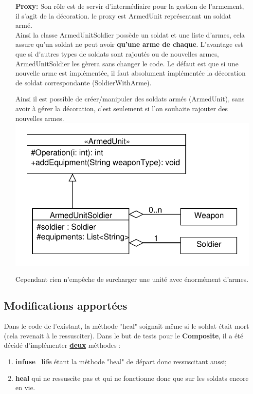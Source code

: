 ﻿\documentclass[12pt]{article}
\begin{document}
\begin{enumerate}
\item[\textbf{Proxy:}] Son rôle est de servir d'intermédiaire pour la gestion de l'armement, il s'agit de la décoration. le proxy est ArmedUnit représentant un soldat armé.\\
Ainsi la classe ArmedUnitSoldier possède un soldat et une liste d'armes,
cela assure qu'un soldat ne peut avoir \textbf{qu'une arme de chaque}.
L'avantage est que si d'autres types de soldats
sont rajoutés ou de nouvelles armes, ArmedUnitSoldier les gèrera sans changer le 
code. Le défaut est que si une nouvelle arme est implémentée, il faut absolument
implémentée la décoration de soldat correspondante (SoldierWith{Arme}).

Ainsi il est possible de créer/manipuler des soldats armés (ArmedUnit),
sans avoir à gérer la décoration, c'est seulement si l'on souhaite rajouter des nouvelles armes.
\includegraphics[scale=1]{../UML/Proxy}

Cependant rien n'empêche de surcharger une unité avec énormément d'armes.
\end{enumerate}
\subsection{Modifications apportées}
Dans le code de l'existant, la méthode "heal" soignait même si le soldat était mort (cela revenait à le ressusciter).
Dans le but de tests pour le \textbf{Composite}, il a été décidé d'implémenter \underline{\textbf{deux}} méthodes :
\begin{enumerate}
 \item \textbf{infuse\_life} étant la méthode "heal" de départ donc ressuscitant aussi;
 \item \textbf{heal} qui ne ressuscite pas et qui ne fonctionne donc que sur les soldats encore en vie.
\end{enumerate}
\end{document}
